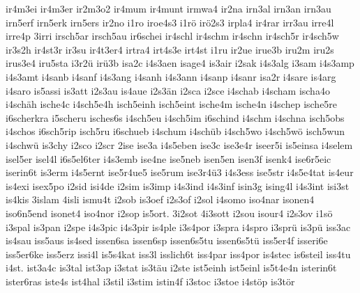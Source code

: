 {    ir4m3ei
    ir4m3er
    ir2m3o2
    ir4mum
    ir4munt
    irmwa4
    ir2na
    irn3al
    irn3an
    irn3au
    irn5erf
    irn5erk
    irn5ers
    ir2no
    i1ro
    iroe4s3
    i1rö
    irö2s3
    irpla4
    ir4rar
    irr3au
    irre4l
    irre4p
    3irri
    irsch5ar
    irsch5au
    ir6schei
    ir4schl
    ir4schm
    ir4schn
    ir4sch5r
    ir4sch5w
    ir3s2h
    ir4st3r
    ir3su
    ir4t3er4
    irtra4
    irt4s3e
    irt4st
    i1ru
    ir2ue
    irue3b
    iru2m
    iru2s
    irus3e4
    iru5sta
    i3r2ü
    irü3b
    isa2c
    i4s3aen
    isage4
    is3air
    i2sak
    i4s3alg
    i3sam
    i4s3amp
    i4s3amt
    i4sanb
    i4sanf
    i4s3ang
    i4sanh
    i4s3ann
    i4sanp
    i4sanr
    isa2r
    i4sare
    is4arg
    i4saro
    is5assi
    is3att
    i2s3au
    is4aue
    i2s3än
    i2sca
    i2sce
    i4schab
    i4scham
    ischa4o
    i4schäh
    ische4c
    i4sch5e4h
    isch5einh
    isch5eint
    ische4m
    ische4n
    i4schep
    ische5re
    i6scherkra
    i5scheru
    isches6s
    i4sch5eu
    i4sch5im
    i6schind
    i4schm
    i4schna
    isch5obs
    i4schos
    i6sch5rip
    isch5ru
    i6schueb
    i4schum
    i4schüb
    i4sch5wo
    i4sch5wö
    isch5wun
    i4schwü
    is3chy
    i2sco
    i2scr
    2ise
    ise3a
    i4s5eben
    ise3c
    ise3e4r
    iseer5i
    is5einsa
    i4selem
    isel5er
    isel4l
    i6s5el6ter
    i4s3emb
    ise4ne
    ise5neb
    isen5en
    isen3f
    isenk4
    ise6r5eic
    iserin6t
    is3erm
    i4s5ernt
    ise5r4ue5
    ise5rum
    ise3r4ü3
    i4s3ess
    ise5str
    i4s5e4tat
    is4eur
    is4exi
    isex5po
    i2sid
    isi4de
    i2sim
    is3imp
    i4s3ind
    i4s3inf
    isin3g
    ising4l
    i4s3int
    isi3st
    is4kis
    3islam
    4isli
    ismu4t
    i2sob
    is3oef
    i2s3of
    i2sol
    i4somo
    iso4nar
    isonen4
    iso6n5end
    isonet4
    iso4nor
    i2sop
    is5ort.
    3i2sot
    4i3sott
    i2sou
    isour4
    i2s3ov
    i1sö
    i3spal
    is3pan
    i2spe
    i4s3pic
    i4s3pir
    is4ple
    i3s4por
    i3spra
    i4spro
    i3sprü
    is3pü
    iss3ac
    is4sau
    iss5aus
    is4sed
    issen6sa
    issen6sp
    issen6s5tu
    issen6s5tü
    iss5er4f
    isseri6e
    iss5er6ke
    iss5erz
    issi4l
    is5s4kat
    iss3l
    isslich6t
    iss4par
    iss4por
    is4stec
    is6steil
    iss4tu
    i4st.
    ist3a4c
    is3tal
    ist3ap
    i3stat
    is3täu
    i2ste
    ist5einh
    ist5einl
    is5t4e4n
    isterin6t
    ister6ras
    iste4s
    ist4hal
    i3stil
    i3stim
    istin4f
    i3stoc
    i3stoe
    i4stöp
    is3tör
}
